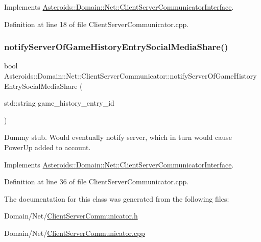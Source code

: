 Implements \hyperlink{classAsteroids_1_1Domain_1_1Net_1_1ClientServerCommunicatorInterface_a02e01e493689e98bf44aa9a40feee063}{Asteroids\+::\+Domain\+::\+Net\+::\+Client\+Server\+Communicator\+Interface}.



Definition at line 18 of file Client\+Server\+Communicator.\+cpp.

\mbox{\label{classAsteroids_1_1Domain_1_1Net_1_1ClientServerCommunicator_a1910e3929adb473f705b82b793dff450}} 
\subsubsection{\texorpdfstring{notify\+Server\+Of\+Game\+History\+Entry\+Social\+Media\+Share()}{notifyServerOfGameHistoryEntrySocialMediaShare()}}
{\footnotesize\ttfamily bool Asteroids\+::\+Domain\+::\+Net\+::\+Client\+Server\+Communicator\+::notify\+Server\+Of\+Game\+History\+Entry\+Social\+Media\+Share (\begin{DoxyParamCaption}\item[{std\+::string}]{game\+\_\+history\+\_\+entry\+\_\+id }\end{DoxyParamCaption})\hspace{0.3cm}{\ttfamily [virtual]}}



Dummy stub. Would eventually notify server, which in turn would cause Power\+Up added to account. 



Implements \hyperlink{classAsteroids_1_1Domain_1_1Net_1_1ClientServerCommunicatorInterface_a99c8f2baa739330f44096da950a1d145}{Asteroids\+::\+Domain\+::\+Net\+::\+Client\+Server\+Communicator\+Interface}.



Definition at line 36 of file Client\+Server\+Communicator.\+cpp.



The documentation for this class was generated from the following files\+:\begin{DoxyCompactItemize}
\item 
Domain/\+Net/\hyperlink{ClientServerCommunicator_8h}{Client\+Server\+Communicator.\+h}\item 
Domain/\+Net/\hyperlink{ClientServerCommunicator_8cpp}{Client\+Server\+Communicator.\+cpp}\end{DoxyCompactItemize}
